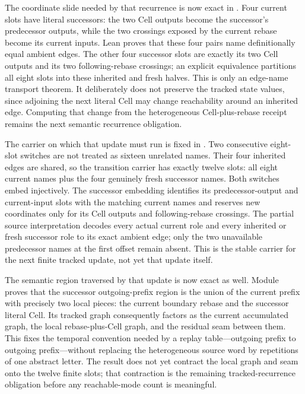 \documentclass[11pt]{article}
\theoremstyle{definition}
\begin{document}
The coordinate slide needed by that recurrence is now exact in
.
Four current slots have literal successors: the two Cell outputs become the
successor's predecessor outputs, while the two crossings exposed by the
current rebase become its current inputs.  Lean proves that these four pairs
name definitionally equal ambient edges.  The other four successor slots are
exactly its two Cell outputs and its two following-rebase crossings; an
explicit equivalence partitions all eight slots into these inherited and
fresh halves.  This is only an edge-name transport theorem.  It deliberately
does not preserve the tracked state values, since adjoining the next literal
Cell may change reachability around an inherited edge.  Computing that change
from the heterogeneous Cell-plus-rebase receipt remains the next semantic
recurrence obligation.

The carrier on which that update must run is fixed in
.
Two consecutive eight-slot switches are not treated as sixteen unrelated
names.  Their four inherited edges are shared, so the transition carrier has
exactly twelve slots: all eight current names plus the four genuinely fresh
successor names.  Both switches embed injectively.  The successor embedding
identifies its predecessor-output and current-input slots with the matching
current names and reserves new coordinates only for its Cell outputs and
following-rebase crossings.  The partial source interpretation decodes every
actual current role and every inherited or fresh successor role to its exact
ambient edge; only the two unavailable predecessor names at the first offset
remain absent.  This is the stable carrier for the next finite tracked update,
not yet that update itself.

The semantic region traversed by that update is now exact as well.  Module
proves that the successor outgoing-prefix region is the union of the current
prefix with precisely two local pieces: the current boundary rebase and the
successor literal Cell.  Its tracked graph consequently factors as the
current accumulated graph, the local rebase-plus-Cell graph, and the residual
seam between them.  This fixes the temporal convention needed by a replay
table---outgoing prefix to outgoing prefix---without replacing the
heterogeneous source word by repetitions of one abstract letter.  The result
does not yet contract the local graph and seam onto the twelve finite slots;
that contraction is the remaining tracked-recurrence obligation before any
reachable-mode count is meaningful.
\end{document}

